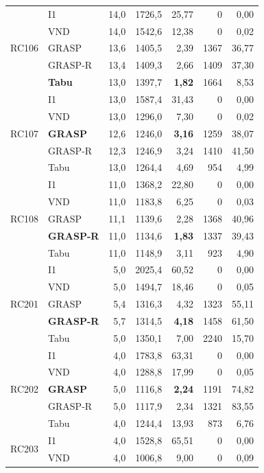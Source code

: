 {\begin{longtable}{llrrrrr}
\midrule
\multirow{5}{*}{RC106}
  & I1 & 14,0 & 1726,5 & 25,77 & 0 & 0,00 \\
  & VND & 14,0 & 1542,6 & 12,38 & 0 & 0,02 \\
  & GRASP & 13,6 & 1405,5 & 2,39 & 1367 & 36,77 \\
  & GRASP-R & 13,4 & 1409,3 & 2,66 & 1409 & 37,30 \\
  & \textbf{Tabu} & 13,0 & 1397,7 & \textbf{1,82} & 1664 & 8,53 \\
\midrule
\multirow{5}{*}{RC107}
  & I1 & 13,0 & 1587,4 & 31,43 & 0 & 0,00 \\
  & VND & 13,0 & 1296,0 & 7,30 & 0 & 0,02 \\
  & \textbf{GRASP} & 12,6 & 1246,0 & \textbf{3,16} & 1259 & 38,07 \\
  & GRASP-R & 12,3 & 1246,9 & 3,24 & 1410 & 41,50 \\
  & Tabu & 13,0 & 1264,4 & 4,69 & 954 & 4,99 \\
\midrule
\multirow{5}{*}{RC108}
  & I1 & 11,0 & 1368,2 & 22,80 & 0 & 0,00 \\
  & VND & 11,0 & 1183,8 & 6,25 & 0 & 0,03 \\
  & GRASP & 11,1 & 1139,6 & 2,28 & 1368 & 40,96 \\
  & \textbf{GRASP-R} & 11,0 & 1134,6 & \textbf{1,83} & 1337 & 39,43 \\
  & Tabu & 11,0 & 1148,9 & 3,11 & 923 & 4,90 \\
\midrule
\multirow{5}{*}{RC201}
  & I1 & 5,0 & 2025,4 & 60,52 & 0 & 0,00 \\
  & VND & 5,0 & 1494,7 & 18,46 & 0 & 0,05 \\
  & GRASP & 5,4 & 1316,3 & 4,32 & 1323 & 55,11 \\
  & \textbf{GRASP-R} & 5,7 & 1314,5 & \textbf{4,18} & 1458 & 61,50 \\
  & Tabu & 5,0 & 1350,1 & 7,00 & 2240 & 15,70 \\
\midrule
\multirow{5}{*}{RC202}
  & I1 & 4,0 & 1783,8 & 63,31 & 0 & 0,00 \\
  & VND & 4,0 & 1288,8 & 17,99 & 0 & 0,05 \\
  & \textbf{GRASP} & 5,0 & 1116,8 & \textbf{2,24} & 1191 & 74,82 \\
  & GRASP-R & 5,0 & 1117,9 & 2,34 & 1321 & 83,55 \\
  & Tabu & 4,0 & 1244,4 & 13,93 & 873 & 6,76 \\
\midrule
\multirow{5}{*}{RC203}
  & I1 & 4,0 & 1528,8 & 65,51 & 0 & 0,00 \\
  & VND & 4,0 & 1006,8 & 9,00 & 0 & 0,09 \\

\end{longtable}}
